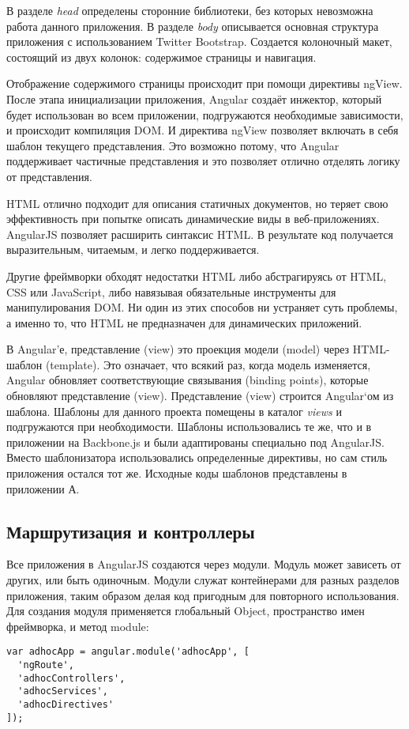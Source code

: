 В разделе \textit{head} определены сторонние библиотеки, без которых невозможна работа данного приложения. В разделе \textit{body} описывается основная структура приложения с использованием Twitter Bootstrap. Создается колоночный макет, состоящий из двух колонок: содержимое страницы и навигация.

Отображение содержимого страницы происходит при помощи директивы ngView. После этапа инициализации приложения, Angular создаёт инжектор, который будет использован во всем приложении, подгружаются необходимые зависимости, и происходит компиляция DOM. И директива ngView позволяет включать в себя шаблон текущего представления. Это возможно потому, что Angular поддерживает частичные представления и это позволяет отлично отделять логику от представления.

HTML отлично подходит для описания статичных документов, но теряет свою эффективность при попытке описать динамические виды в веб-приложениях. AngularJS позволяет расширить синтаксис HTML. В результате код получается выразительным, читаемым, и легко поддерживается.

Другие фреймворки обходят недостатки HTML либо абстрагируясь от HTML, CSS или JavaScript, либо навязывая обязательные инструменты для манипулирования DOM. Ни один из этих способов ни устраняет суть проблемы, а именно то, что HTML не предназначен для динамических приложений.

В Angular'е, представление (view) это проекция модели (model) через HTML-шаблон (template). Это означает, что всякий раз, когда модель изменяется, Angular обновляет соответствующие связывания (binding points), которые обновляют представление (view). Представление (view) строится Angular`ом из шаблона. Шаблоны для данного проекта помещены в каталог \textit{views} и подгружаются при необходимости. Шаблоны использовались те же, что и в приложении на Backbone.js и были адаптированы специально под AngularJS. Вместо шаблонизатора использовались определенные директивы, но сам стиль приложения остался тот же. Исходные коды шаблонов представлены в приложении А.

\subsection{Маршрутизация и контроллеры}

Все приложения в AngularJS создаются через модули. Модуль может зависеть от других, или быть одиночным. Модули служат контейнерами для разных разделов приложения, таким образом делая код пригодным для повторного использования. Для создания модуля применяется глобальный Object, пространство имен фреймворка, и метод module:
\begin{lstlisting}[basicstyle=\normalsize]
var adhocApp = angular.module('adhocApp', [
  'ngRoute',
  'adhocControllers',
  'adhocServices',
  'adhocDirectives'
]);
\end{lstlisting}

